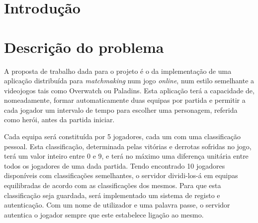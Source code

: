 \documentclass[a4paper]{article}
\begin{document}
\begin{abstract}

\hspace{3mm} 

\end{abstract}

\pagebreak
\tableofcontents

\pagebreak
\section{Introdução}
\label{sec:1}

\hspace{3mm} 




\pagebreak
\section{Descrição do problema}
\label{sec:2}

\hspace{3mm} A proposta de trabalho dada para o projeto é o da implementação de uma aplicação distribuída para \textit{matchmaking} num jogo \textit{online}, num estilo semelhante a videojogos tais como Overwatch ou Paladins. Esta aplicação terá a capacidade de, nomeadamente, formar automaticamente duas equipas por partida e permitir a cada jogador um intervalo de tempo para escolher uma personagem, referida como herói, antes da partida iniciar.

\par Cada equipa será constituída por 5 jogadores, cada um com uma classificação pessoal. Esta classificação, determinada pelas vitórias e derrotas sofridas no jogo, terá um valor inteiro entre 0 e 9, e terá no máximo uma diferença unitária entre todos os jogadores de uma dada partida. Tendo encontrado 10 jogadores disponíveis com classificações semelhantes, o servidor dividi-los-á em equipas equilibradas de acordo com as classificações dos mesmos. Para que esta classificação seja guardada, será implementado um sistema de registo e autenticação. Com um nome de utilizador e uma palavra passe, o servidor autentica o jogador sempre que este estabelece ligação ao mesmo.
\end{document}

